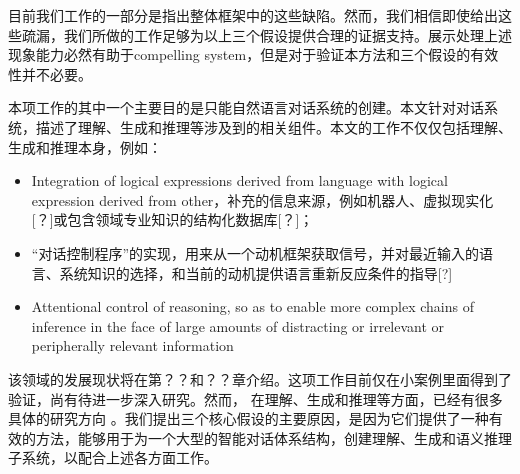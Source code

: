 目前我们工作的一部分是指出整体框架中的这些缺陷。然而，我们相信即使给出这些疏漏，我们所做的工作足够为以上三个假设提供合理的证据支持。展示处理上述现象能力必然有助于compelling system，但是对于验证本方法和三个假设的有效性并不必要。

本项工作的其中一个主要目的是只能自然语言对话系统的创建。本文针对对话系统，描述了理解、生成和推理等涉及到的相关组件。本文的工作不仅仅包括理解、生成和推理本身，例如：
\begin{itemize}
\item Integration of logical expressions derived from language with logical expression derived from other，补充的信息来源，例如机器人、虚拟现实化[？]或包含领域专业知识的结构化数据库[？]；
\item “对话控制程序”的实现，用来从一个动机框架获取信号，并对最近输入的语言、系统知识的选择，和当前的动机提供语言重新反应条件的指导[?]
\item Attentional control of reasoning, so as to enable more complex chains of inference in the face of large amounts of distracting or irrelevant or peripherally relevant information
\end{itemize}

该领域的发展现状将在第？？和？？章介绍。这项工作目前仅在小案例里面得到了验证，尚有待进一步深入研究。然而， 在理解、生成和推理等方面，已经有很多具体的研究方向  。我们提出三个核心假设的主要原因，是因为它们提供了一种有效的方法，能够用于为一个大型的智能对话体系结构，创建理解、生成和语义推理子系统，以配合上述各方面工作。

